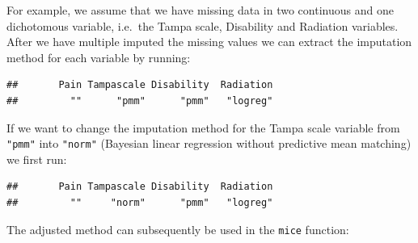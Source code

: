 \documentclass[
]{book}
\newenvironment{Shaded}{\begin{snugshade}}{\end{snugshade}}
\newcommand{\CommentTok}[1]{\textcolor[rgb]{0.56,0.35,0.01}{\textit{#1}}}
\newcommand{\DataTypeTok}[1]{\textcolor[rgb]{0.13,0.29,0.53}{#1}}
\newcommand{\DecValTok}[1]{\textcolor[rgb]{0.00,0.00,0.81}{#1}}
\newcommand{\KeywordTok}[1]{\textcolor[rgb]{0.13,0.29,0.53}{\textbf{#1}}}
\newcommand{\NormalTok}[1]{#1}
\newcommand{\OperatorTok}[1]{\textcolor[rgb]{0.81,0.36,0.00}{\textbf{#1}}}
\newcommand{\OtherTok}[1]{\textcolor[rgb]{0.56,0.35,0.01}{#1}}
\newcommand{\StringTok}[1]{\textcolor[rgb]{0.31,0.60,0.02}{#1}}
\begin{document}
For example, we assume that we have missing data in two continuous and
one dichotomous variable, i.e.~the Tampa scale, Disability and Radiation
variables. After we have multiple imputed the missing values we can
extract the imputation method for each variable by running:

\begin{Shaded}
\end{Shaded}

\begin{verbatim}
##       Pain Tampascale Disability  Radiation 
##         ""      "pmm"      "pmm"   "logreg"
\end{verbatim}

If we want to change the imputation method for the Tampa scale variable
from \texttt{"pmm"} into \texttt{"norm"} (Bayesian linear regression
without predictive mean matching) we first run:

\begin{Shaded}
\end{Shaded}

\begin{verbatim}
##       Pain Tampascale Disability  Radiation 
##         ""     "norm"      "pmm"   "logreg"
\end{verbatim}

The adjusted method can subsequently be used in the \texttt{mice}
function:
\end{document}
